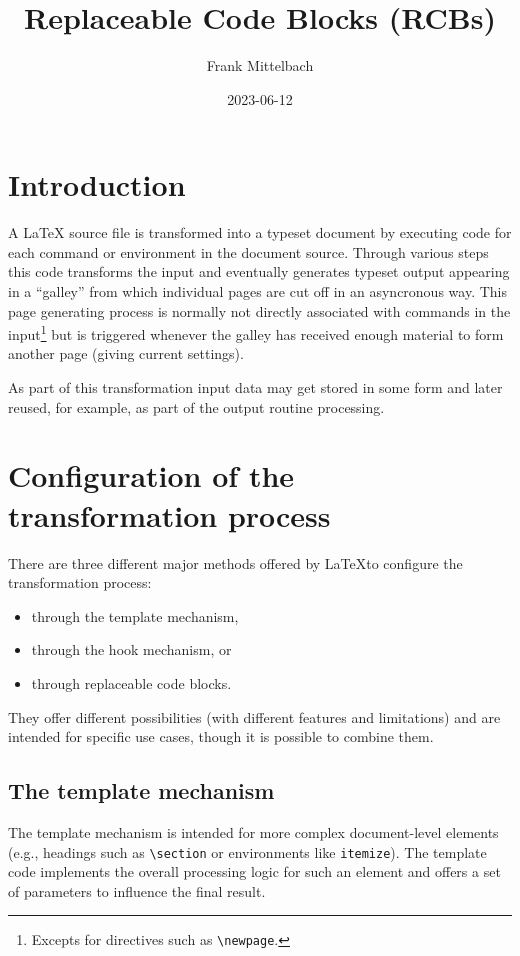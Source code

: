 \documentclass{article}
\newcommand\cs[1]{\texttt{\textbackslash #1}}
\begin{document}
\title{Replaceable Code Blocks (RCBs)}
\author{Frank Mittelbach}
\date{2023-06-12}

\maketitle

\tableofcontents

\section{Introduction}

A \LaTeX{} source file is transformed into a typeset document by
executing code for each command or environment in the document
source. Through various steps this code transforms the input and
eventually generates typeset output appearing in a \enquote{galley}
from which individual pages are cut off in an asyncronous way. This
page generating process is normally not directly associated with
commands in the input\footnote{Excepts for directives such as
  \cs{newpage}.} but is triggered whenever the galley has received
enough material to form another page (giving current settings).

As part of this transformation input data may get stored in some form
and later reused, for example, as part of the output routine
processing.

\section{Configuration of the transformation process}

There are three different major methods offered by \LaTeX to configure
the transformation process:
\begin{itemize}
\item through the template mechanism,
\item through the hook mechanism, or
\item through replaceable code blocks.
\end{itemize}
They offer different possibilities (with different features and
limitations) and are intended for specific use cases, though it is
possible to combine them.

\subsection{The template mechanism}

The template mechanism is intended for more complex document-level
elements (e.g., headings such as \verb=\section= or environments like
\texttt{itemize}). The template code implements the overall processing
logic for such an element and offers a set of parameters to influence
the final result.
\end{document}
